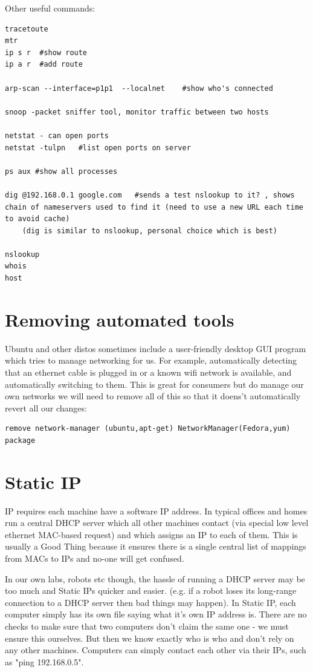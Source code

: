 \documentclass[oneside,english]{scrbook}
\begin{document}
Other useful commands:
\begin{lstlisting}
tracetoute
mtr
ip s r  #show route
ip a r  #add route

arp-scan --interface=p1p1  --localnet    #show who's connected

snoop -packet sniffer tool, monitor traffic between two hosts

netstat - can open ports
netstat -tulpn   #list open ports on server

ps aux #show all processes

dig @192.168.0.1 google.com   #sends a test nslookup to it? , shows chain of nameservers used to find it (need to use a new URL each time to avoid cache)
    (dig is similar to nslookup, personal choice which is best)

nslookup
whois
host
\end{lstlisting}


\section{Removing automated tools}
Ubuntu and other distos sometimes include a user-friendly desktop GUI program which tries to manage networking for us. For example, automatically detecting that an ethernet cable is plugged in or a known wifi network is available, and automatically switching to them.  This is great for consumers but do manage our own networks we will need to remove all of this so that it doens't automatically revert all our changes:

\begin{lstlisting}
remove network-manager (ubuntu,apt-get) NetworkManager(Fedora,yum) package 
\end{lstlisting}
  

\section{Static IP}

IP requires each machine have a software IP address.  In typical offices and homes run a central DHCP server which all other machines contact (via special low level ethernet MAC-based request) and which assigns an IP to each of them.  This is usually a Good Thing because it ensures there is a single central list of mappings from MACs to IPs and no-one will get confused.  

In our own labs, robots etc though, the hassle of running a DHCP server may be too much and Static IPs quicker and easier.  (e.g. if a robot loses its long-range connection to a DHCP server then bad things may happen).   In Static IP, each computer simply has its own file saying what it's own IP address is.  There are no checks to make sure that two computers don't claim the same one - we must ensure this ourselves.  But then we know exactly who is who and don't rely on any other machines.  Computers can simply contact each other via their IPs, such as "ping 192.168.0.5".
\end{document}
